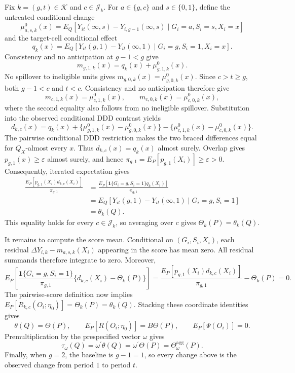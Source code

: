 Fix \(k=(g,t)\in\mathcal K\) and \(c\in\mathcal J_k\). For \(a\in\{g,c\}\) and \(s\in\{0,1\}\), define the untreated conditional change
\[
 \mu^0_{a,s,k}(x)
 =E_Q\!\left[Y_{it}(\infty,s)-Y_{i,g-1}(\infty,s)
       \mid G_i=a,S_i=s,X_i=x\right]
\]
and the target-cell conditional effect
\[
 q_k(x)=E_Q\!\left[Y_{it}(g,1)-Y_{it}(\infty,1)
       \mid G_i=g,S_i=1,X_i=x\right].
\]
Consistency and no anticipation at \(g-1<g\) give
\[
 m_{g,1,k}(x)=q_k(x)+\mu^0_{g,1,k}(x).
\]
No spillover to ineligible units gives \(m_{g,0,k}(x)=\mu^0_{g,0,k}(x)\). Since \(c>t\ge g\), both \(g-1<c\) and \(t<c\). Consistency and no anticipation therefore give
\[
 m_{c,1,k}(x)=\mu^0_{c,1,k}(x),
 \qquad
 m_{c,0,k}(x)=\mu^0_{c,0,k}(x),
\]
where the second equality also follows from no ineligible spillover. Substitution into the observed conditional DDD contrast yields
\[
 d_{k,c}(x)=q_k(x)
 +\{\mu^0_{g,1,k}(x)-\mu^0_{g,0,k}(x)\}
 -\{\mu^0_{c,1,k}(x)-\mu^0_{c,0,k}(x)\}.
\]
The pairwise conditional DDD restriction makes the two braced differences equal for \(Q_X\)-almost every \(x\). Thus \(d_{k,c}(x)=q_k(x)\) almost surely. Overlap gives \(p_{g,1}(x)\ge\varepsilon\) almost surely, and hence \(\pi_{g,1}=E_P[p_{g,1}(X_i)]\ge\varepsilon>0\). Consequently, iterated expectation gives
\[
\begin{aligned}
 \frac{E_P[p_{g,1}(X_i)d_{k,c}(X_i)]}{\pi_{g,1}}
 &=\frac{E_P[\mathbf 1\{G_i=g,S_i=1\}q_k(X_i)]}{\pi_{g,1}}\\
 &=E_Q[Y_{it}(g,1)-Y_{it}(\infty,1)\mid G_i=g,S_i=1]\\
 &=\theta_k(Q).
\end{aligned}
\]
This equality holds for every \(c\in\mathcal J_k\), so averaging over \(c\) gives \(\Theta_k(P)=\theta_k(Q)\).

It remains to compute the score mean. Conditional on \((G_i,S_i,X_i)\), each residual \(\Delta Y_{i,k}-m_{a,s,k}(X_i)\) appearing in the score has mean zero. All residual summands therefore integrate to zero. Moreover,
\[
 E_P\!\left[\frac{\mathbf 1\{G_i=g,S_i=1\}}{\pi_{g,1}}
 \{d_{k,c}(X_i)-\Theta_k(P)\}\right]
 =\frac{E_P[p_{g,1}(X_i)d_{k,c}(X_i)]}{\pi_{g,1}}-\Theta_k(P)=0.
\]
The pairwise-score definition now implies \(E_P[R_{k,c}(O_i;\eta_0)]=\Theta_k(P)=\theta_k(Q)\). Stacking these coordinate identities gives
\[
 \theta(Q)=\Theta(P),\qquad
 E_P[R(O_i;\eta_0)]=B\Theta(P),\qquad
 E_P[\Psi(O_i)]=0.
\]
Premultiplication by the prespecified vector \(\omega\) gives
\[
 \tau_\omega(Q)=\omega^{\prime}\theta(Q)
 =\omega^{\prime}\Theta(P)=\Theta_\omega^{\mathrm{agg}}(P).
\]
Finally, when \(g=2\), the baseline is \(g-1=1\), so every change above is the observed change from period \(1\) to period \(t\).